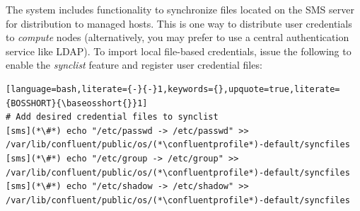 The \Confluent{} system includes functionality to synchronize files located on the
SMS server for distribution to managed hosts. This is one way to
distribute user credentials to {\em compute} nodes (alternatively, you may
prefer to use a central authentication service like LDAP). To import local file-based
credentials, issue the following to enable the {\em synclist} feature and
register user credential files:

\begin{lstlisting}[language=bash,literate={-}{-}1,keywords={},upquote=true,literate={BOSSHORT}{\baseosshort{}}1]
# Add desired credential files to synclist
[sms](*\#*) echo "/etc/passwd -> /etc/passwd" >> /var/lib/confluent/public/os/(*\confluentprofile*)-default/syncfiles
[sms](*\#*) echo "/etc/group -> /etc/group" >> /var/lib/confluent/public/os/(*\confluentprofile*)-default/syncfiles
[sms](*\#*) echo "/etc/shadow -> /etc/shadow" >> /var/lib/confluent/public/os/(*\confluentprofile*)-default/syncfiles
\end{lstlisting}
